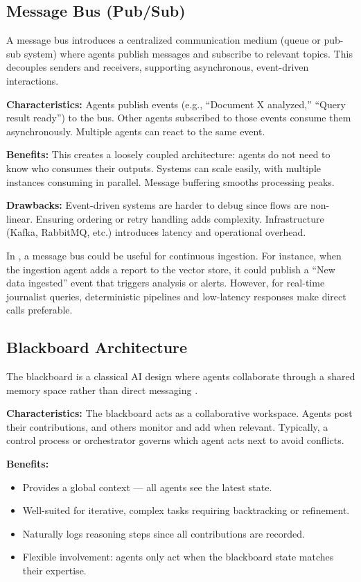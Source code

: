 \subsection{Message Bus (Pub/Sub)}
A message bus introduces a centralized communication medium (queue or pub-sub system) where agents publish messages and subscribe to relevant topics. This decouples senders and receivers, supporting asynchronous, event-driven interactions.  

\textbf{Characteristics:} Agents publish events (e.g., “Document X analyzed,” “Query result ready”) to the bus. Other agents subscribed to those events consume them asynchronously. Multiple agents can react to the same event.  

\textbf{Benefits:} This creates a loosely coupled architecture: agents do not need to know who consumes their outputs. Systems can scale easily, with multiple instances consuming in parallel. Message buffering smooths processing peaks.  

\textbf{Drawbacks:} Event-driven systems are harder to debug since flows are non-linear. Ensuring ordering or retry handling adds complexity. Infrastructure (Kafka, RabbitMQ, etc.) introduces latency and operational overhead.  

In \ishtar{}, a message bus could be useful for continuous ingestion. For instance, when the ingestion agent adds a report to the vector store, it could publish a “New data ingested” event that triggers analysis or alerts. However, for real-time journalist queries, deterministic pipelines and low-latency responses make direct calls preferable.  

\subsection{Blackboard Architecture}
The blackboard is a classical AI design where agents collaborate through a shared memory space rather than direct messaging \cite{emergentmind2}.  

\textbf{Characteristics:} The blackboard acts as a collaborative workspace. Agents post their contributions, and others monitor and add when relevant. Typically, a control process or orchestrator governs which agent acts next to avoid conflicts.  

\textbf{Benefits:}  
\begin{itemize}
    \item Provides a global context — all agents see the latest state.  
    \item Well-suited for iterative, complex tasks requiring backtracking or refinement.  
    \item Naturally logs reasoning steps since all contributions are recorded.  
    \item Flexible involvement: agents only act when the blackboard state matches their expertise.  
\end{itemize}  

